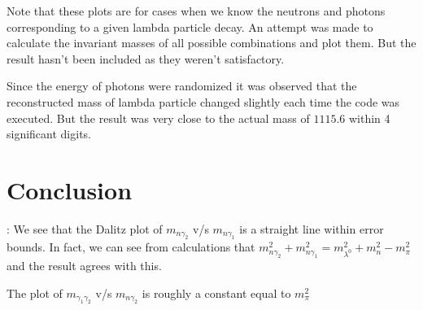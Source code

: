 \documentclass[11pt, a4paper]{article}
\begin{document}
Note that these plots are for cases when we know the neutrons and photons corresponding to a given lambda particle decay.
An attempt was made to calculate the invariant masses of all possible combinations and plot them. But the result hasn't been 
included as they weren't satisfactory.

Since the energy of photons were randomized it was observed that the reconstructed mass of lambda particle changed slightly 
each time the code was executed. But the result was very close to the actual mass of $1115.6$ within 4 significant digits.

\section{Conclusion}:
We see that the Dalitz plot of $m_{n\gamma_2}$ v/s $m_{n\gamma_1}$ is a straight line within error bounds. In fact, we can
see from calculations that $m_{n\gamma_2} ^2 + m_{n\gamma_1} ^2 = m_{\lambda ^0}^2 + m_n ^2 - m_{\pi} ^2$ and the result 
agrees with this. 

The plot of  $m_{\gamma_1 \gamma_2}$ v/s $m_{n\gamma_2}$ is roughly a constant equal to $m_{\pi} ^2$
\end{document}
